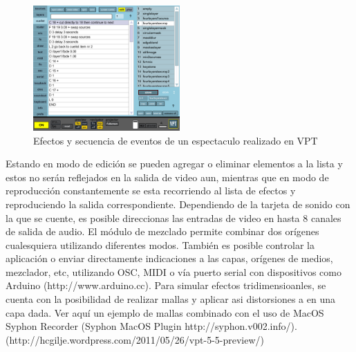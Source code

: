 \begin{figure}[H]
  \centering
    \includegraphics[width=0.5\textwidth]{./Cap3_aplicaciones/apps-vpt-cuelist.png}
  \caption{Efectos y secuencia de eventos de un espectaculo realizado en VPT}
  \label{fig:Apps-VPTCuelist}
\end{figure}



Estando en modo de edición se pueden agregar o eliminar elementos a la lista y estos no serán reflejados en la salida de video aun, mientras que en modo de reproducción constantemente se esta recorriendo al lista de efectos y reproduciendo la salida correspondiente.
Dependiendo de la tarjeta de sonido con la que se cuente, es posible direccionas las entradas de video en hasta 8 canales de salida de audio. El módulo de mezclado permite combinar dos orígenes cualesquiera utilizando diferentes modos. También es posible controlar la aplicación o enviar directamente indicaciones a las capas, orígenes de medios, mezclador, etc, utilizando OSC, MIDI o vía puerto serial con dispositivos como Arduino (http://www.arduino.cc).
Para simular efectos tridimensioanles, se cuenta con la posibilidad de realizar mallas y aplicar asi distorsiones a en una capa dada. Ver aquí un ejemplo de mallas combinado con el uso de MacOS Syphon Recorder (Syphon MacOS Plugin http://syphon.v002.info/). (http://hcgilje.wordpress.com/2011/05/26/vpt-5-5-preview/)
